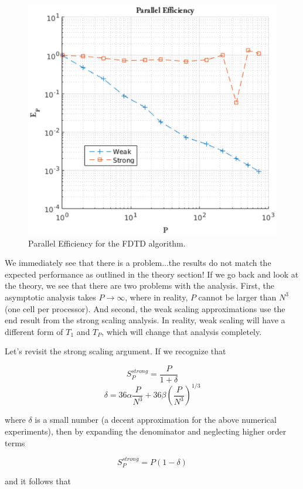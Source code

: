\documentclass{article}
\begin{document}
\begin{figure}[!h]
\centering
\includegraphics[scale=0.6]{figs/efficiency.eps}
\caption{Parallel Efficiency for the FDTD algorithm.}
\end{figure}

We immediately see that there is a problem...the results do not match the expected performance as outlined in the theory section! If we go back and look at the theory, we see that there are two problems with the analysis. First, the asymptotic analysis takes $P\rightarrow \infty$, where in reality, $P$ cannot be larger than $N^3$ (one cell per processor). And second, the weak scaling approximations use the end result from the strong scaling analysis. In reality, weak scaling will have a different form of $T_1$ and $T_P$, which will change that analysis completely. 

Let's revisit the strong scaling argument. If we recognize that

$$S_P^{strong} = \frac{P}{1 + \delta}$$
$$ \delta = 36 \alpha \frac{P}{N^3} + 36\beta(\frac{P}{N^3})^{1/3}$$

where $\delta$ is a small number (a decent approximation for the above numerical experiments), then by expanding the denominator and neglecting higher order terms

$$S_P^{strong} = P(1 - \delta)$$

and it follows that 
\end{document}
